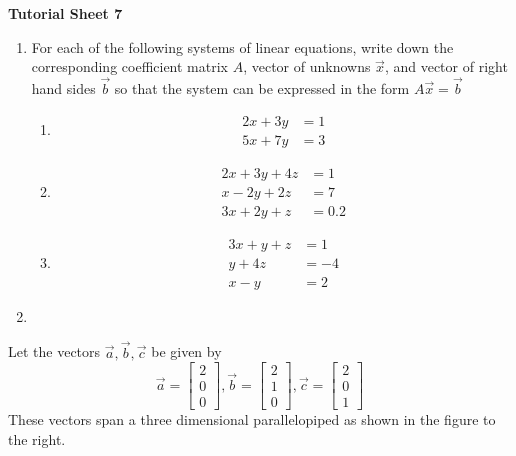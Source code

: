 
\begin{center}
	\textbf{Tutorial Sheet 7}
\end{center}

\begin{enumerate}
	\item
	For each of the following systems of linear equations, write down the corresponding coefficient matrix $A$, vector of unknowns $\vec{x}$, and vector of right hand sides $\vec{b}$ so that the system can be expressed in the form $A\vec{x}=\vec{b}$
	\begin{multicols}{3}
		\begin{enumerate}
			\item
			\begin{align*}
			2x+3y&=1\\
			5x+7y&=3
			\end{align*}
			\item\begin{align*}
			2x+3y+4z&=1\\
			x-2y+2z&=7\\
			3x+2y+z&=0.2
			\end{align*}
			\item
			\begin{align*}
			3x+y+z&=1\\
			y+4z&=-4\\
			x-y&=2
			\end{align*}
		\end{enumerate}
	\end{multicols}
	\item
\end{enumerate}

Let the vectors $\vec{a},\vec{b},\vec{c}$ be given by
\begin{equation*}
\vec{a}=\left[ \begin{array}{c} 2 \\ 0 \\ 0 \end{array}\right],
\vec{b}=\left[ \begin{array}{c} 2 \\ 1 \\ 0 \end{array}\right],
\vec{c}=\left[ \begin{array}{c} 2 \\ 0 \\ 1 \end{array}\right]
\end{equation*}
These vectors span a three dimensional parallelopiped as shown in the figure to the right.

